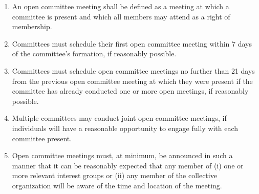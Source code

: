 \documentclass[11pt]{article}
\newcounter{h1}
\newcounter{h2}[h1]
\newcounter{h3}[h2]
\begin{document}

\begin{enumerate}
  \item An open committee meeting shall be defined as a meeting at which a committee is present and which all members may attend as a right of membership.  
  \item Committees must schedule their first open committee meeting within 7 days of the committee's formation, if reasonably possible.  
  \item Committees must schedule open committee meetings no further than 21 days from the previous open committee meeting at which they were present if the committee has already conducted one or more open meetings, if reasonably possible.  
  \item Multiple committees may conduct joint open committee meetings, if individuals will have a reasonable opportunity to engage fully with each committee present.  
  \item Open committee meetings must, at minimum, be announced in such a manner that it can be reasonably expected that any member of (i) one or more relevant interest groups or (ii) any member of the collective organization will be aware of the time and location of the meeting.
\end{enumerate}


\end{document}

